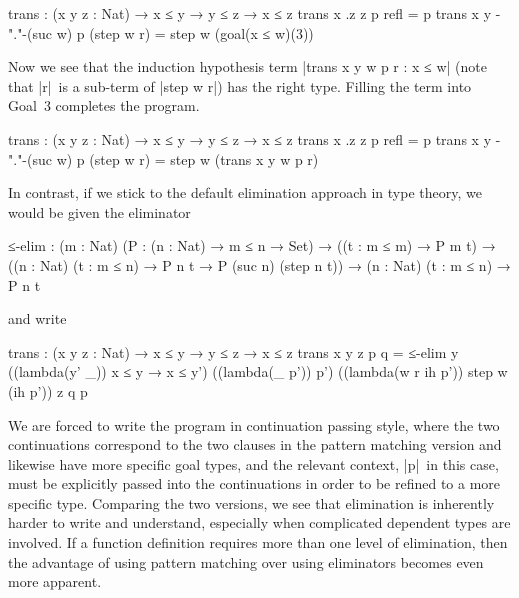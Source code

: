 \begin{code}
trans : (x y z : Nat) → x ≤ y → y ≤ z → x ≤ z
trans x  .z  z               p refl        = p
trans x  y   {-"."-}(suc w)  p (step w r)  = step w (goal(x ≤ w)(3))
\end{code}
Now we see that the induction hypothesis term |trans x y w p r : x ≤ w| (note that |r|~is a sub-term of |step w r|) has the right type.
Filling the term into Goal~3 completes the program.
\begin{code}
trans : (x y z : Nat) → x ≤ y → y ≤ z → x ≤ z
trans x  .z  z               p refl        = p
trans x  y   {-"."-}(suc w)  p (step w r)  = step w (trans x y w p r)
\end{code}
In contrast, if we stick to the default elimination approach in type theory, we would be given the eliminator
\begin{code}
≤-elim :  (m : Nat) (P : (n : Nat) → m ≤ n → Set) →
          ((t : m ≤ m) → P m t) →
          ((n : Nat) (t : m ≤ n) → P n t → P (suc n) (step n t)) →
          (n : Nat) (t : m ≤ n) → P n t
\end{code}
and write
\begin{code}
trans : (x y z : Nat) → x ≤ y → y ≤ z → x ≤ z
trans x y z p q = ≤-elim y  ((lambda(y' _)) x ≤ y → x ≤ y')
                            ((lambda(_ p')) p') ((lambda(w r ih p')) step w (ih p')) z q p
\end{code}
We are forced to write the program in continuation passing style, where the two continuations correspond to the two clauses in the pattern matching version and likewise have more specific goal types, and the relevant context, |p|~in this case, must be explicitly passed into the continuations in order to be refined to a more specific type.
Comparing the two versions, we see that elimination is inherently harder to write and understand, especially when complicated dependent types are involved.
If a function definition requires more than one level of elimination, then the advantage of using pattern matching over using eliminators becomes even more apparent.

